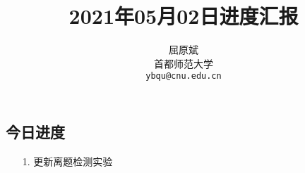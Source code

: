 \documentclass[11pt]{article}
\title{2021年05月02日进度汇报}
\author{屈原斌 \\
  首都师范大学 \\
    {\tt ybqu@cnu.edu.cn}}
\date{}
\begin{document}
\begin{CJK}{UTF8}{gkai}

\maketitle
\CJKindent


\section{今日进度}


\begin{itemize}
  \item [1.] 更新离题检测实验
\end{itemize}


\end{CJK}
\end{document}
